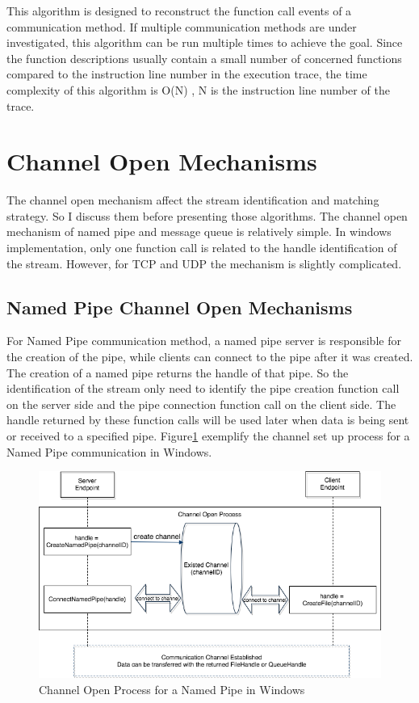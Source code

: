 This algorithm is designed to reconstruct the function call events of a communication method. If multiple communication methods are under investigated, this algorithm can be run multiple times to achieve the goal. Since the function descriptions usually contain a  small number of concerned functions compared to the instruction line number in the execution trace, the time complexity of this algorithm is O(N) , N is the instruction line number of the trace.

\section{Channel Open Mechanisms}\label{mecha}
The channel open mechanism affect the stream identification and matching strategy. So I discuss them before presenting those algorithms. The channel open mechanism of named pipe and message queue is relatively simple. In windows implementation, only one function call is related to the handle identification of the stream. However, for TCP and UDP the mechanism is slightly complicated.

\subsection{Named Pipe Channel Open Mechanisms} 
For Named Pipe communication method, a named pipe server is responsible for the creation of the pipe, while clients can connect to the pipe after it was created. The creation of a named pipe returns the handle of that pipe. So the identification of the stream only need to identify the pipe creation function call on the server side and the pipe connection function call on the client side. The handle returned by these function calls will be used later when data is being sent or received to a specified pipe. Figure\ref{namedpipeopen} exemplify the channel set up process for a Named Pipe communication in Windows. 

\begin{figure}[H]
\centerline{\includegraphics[scale=0.45]{Figures/namepipechannelopen}}
 \caption{Channel Open Process for a Named Pipe in Windows}
\label{namedpipeopen}
\end{figure}
    

